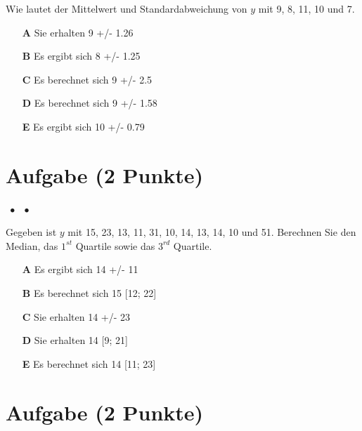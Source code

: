 \documentclass[a4paper, 9pt]{scrartcl}\usepackage[]{graphicx}\usepackage[]{xcolor}
\begin{document}
Wie lautet der Mittelwert und Standardabweichung von $y$ mit 9, 8, 11, 10 und 7.



\begin{enumerate}
\item [\textbf{A} \msquare] Sie erhalten 9 +/- 1.26
\item [\textbf{B} \msquare] Es ergibt sich 8 +/- 1.25
\item [\textbf{C} \msquare] Es berechnet sich 9 +/- 2.5
\item [\textbf{D} \msquare] Es berechnet sich 9 +/- 1.58
\item [\textbf{E} \msquare] Es ergibt sich 10 +/- 0.79
\end{enumerate} 

\section{Aufgabe \hfill (2 Punkte)}

\ifcollection
\begin{flushright}
\tiny\vspace{-2Ex}
\textbf{\examinhaltstart}
\exammodulemathstat $\;\bullet$
\exammodulestat $\;\bullet$
\exammodulestatbbv 
\vspace{-1Ex}
\end{flushright}
\fi




Gegeben ist $y$ mit 15, 23, 13, 11, 31, 10, 14, 13, 14, 10 und 51. Berechnen Sie den Median, das $1^{st}$ Quartile sowie das $3^{rd}$ Quartile.




\begin{enumerate}
\item [\textbf{A} \msquare] Es ergibt sich 14 +/- 11
\item [\textbf{B} \msquare] Es berechnet sich 15 [12; 22]
\item [\textbf{C} \msquare] Sie erhalten 14 +/- 23
\item [\textbf{D} \msquare] Sie erhalten 14 [9; 21]
\item [\textbf{E} \msquare] Es berechnet sich 14 [11; 23]
\end{enumerate} 

\section{Aufgabe \hfill (2 Punkte)}
\end{document}
